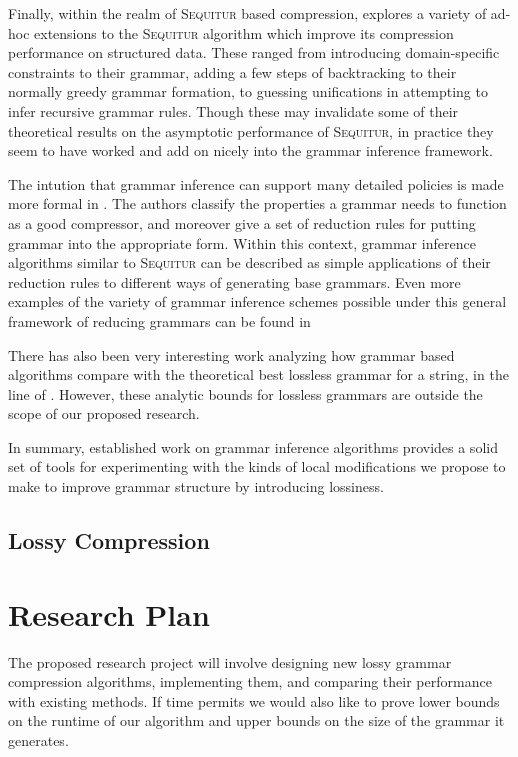 \documentclass[11pt]{article}
\newcommand{\Sequitur}{\textsc{Sequitur}\xspace}
\begin{document}
Finally, within the realm of \Sequitur based compression, \cite{nevillphd}
explores a variety of ad-hoc extensions to the \Sequitur algorithm which improve
its compression performance on structured data. These ranged from introducing
domain-specific constraints to their grammar, adding a few steps of
backtracking to their normally greedy grammar formation, to guessing
unifications in attempting to infer recursive grammar rules. Though these may
invalidate some of their theoretical results on the asymptotic performance of
\Sequitur, in practice they seem to have worked and add on nicely into the
grammar inference framework.

The intution that grammar inference can support many detailed policies is made
more formal in \cite{grammarcodes}. The authors classify the properties a
grammar needs to function as a good compressor, and moreover give a set of
reduction rules for putting grammar into the appropriate form. Within this
context, grammar inference algorithms similar to \Sequitur can be described as
simple applications of their reduction rules to different ways of generating
base grammars. Even more examples of the variety of grammar inference schemes
possible under this general framework of reducing grammars can be found in
\cite{efficientgreedy}

There has also been very interesting work analyzing how grammar based
algorithms compare with the theoretical best lossless grammar for a string, in
the line of \cite{approximation}. However, these analytic bounds for lossless
grammars are outside the scope of our proposed research.

In summary, established work on grammar inference algorithms provides a solid
set of tools for experimenting with the kinds of local modifications we propose
to make to improve grammar structure by introducing lossiness.

\subsection{Lossy Compression}

\section{Research Plan}

The proposed research project will involve designing new lossy grammar
compression algorithms, implementing them, and comparing their performance with
existing methods.  If time permits we would also like to prove lower bounds on
the runtime of our algorithm and upper bounds on the size of the grammar it
generates.
\end{document}
